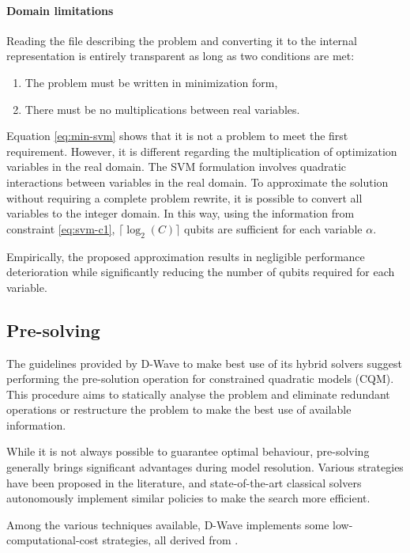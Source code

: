\paragraph{Domain limitations}\label{sec:domain} Reading the file describing the problem and converting it to the internal representation is entirely transparent as long as two conditions are met:
\begin{enumerate}
    \item The problem must be written in minimization form,
    \item There must be no multiplications between real variables.
\end{enumerate}
Equation \ref{eq:min-svm} shows that it is not a problem to meet the first requirement. However, it is different regarding the multiplication of optimization variables in the real domain. The SVM formulation involves quadratic interactions between variables in the real domain. To approximate the solution without requiring a complete problem rewrite, it is possible to convert all variables to the integer domain. In this way, using the information from constraint \ref{eq:svm-c1}, $\lceil\log_2(C)\rceil$ qubits are sufficient for each variable $\alpha$.

Empirically, the proposed approximation results in negligible performance deterioration while significantly reducing the number of qubits required for each variable.

\subsection{Pre-solving}\label{sec:presolve}

The guidelines provided by D-Wave to make best use of its hybrid solvers suggest performing the pre-solution operation for constrained quadratic models (CQM). This procedure aims to statically analyse the problem and eliminate redundant operations or restructure the problem to make the best use of available information.

While it is not always possible to guarantee optimal behaviour, pre-solving generally brings significant advantages during model resolution. Various strategies have been proposed in the literature, and state-of-the-art classical solvers autonomously implement similar policies to make the search more efficient.

Among the various techniques available, D-Wave implements some low-computational-cost strategies, all derived from \cite{PRESOLVE}.

